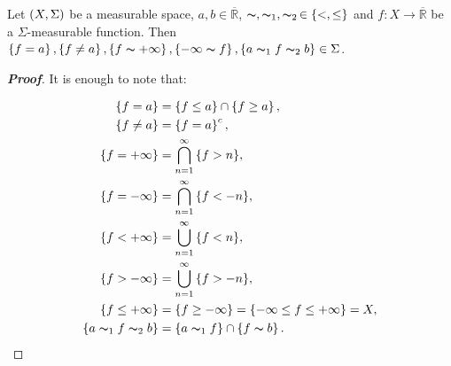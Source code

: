 \begin{corollary}
\rm Let $\left(X,\Sigma\right)$ be a measurable space, $a,b\in\overline{\mathbb{R}}$, $\thicksim,\thicksim_1,\thicksim_2\,\in\left\{<,\leq\right\}$ and $f:X\rightarrow\overline{\mathbb{R}}$ be a $\Sigma$-measurable function. Then $\left\{f=a\right\},\left\{f\neq a\right\},\left\{f\thicksim +\infty\right\},\left\{-\infty\thicksim f\right\},\left\{a\thicksim_1 f\thicksim_2 b\right\}\in\Sigma$.
\begin{proof}[\rm\textbf{Proof}]
It is enough to note that:

\begin{equation}
  \begin{split}
    \left\{f=a\right\} & =\left\{f\leq a\right\}\cap\left\{f\geq a\right\},\\
    \left\{f\neq a\right\} & =\left\{f=a\right\}^c,\\
    \left\{f=+\infty\right\} & =\bigcap_{n=1}^{\infty}{\left\{f>n\right\}},\\
    \left\{f=-\infty\right\} & =\bigcap_{n=1}^{\infty}{\left\{f<-n\right\}},\\
    \left\{f<+\infty\right\} & =\bigcup_{n=1}^{\infty}{\left\{f<n\right\}},\\
    \left\{f>-\infty\right\} & =\bigcup_{n=1}^{\infty}{\left\{f>-n\right\}},\\
    \left\{f\leq +\infty\right\} & =\left\{f\geq -\infty\right\}=\left\{-\infty\leq f\leq +\infty\right\}=X,\\
    \left\{a\thicksim_1 f\thicksim_2 b\right\} & =\left\{a\thicksim_1 f\right\}\cap\left\{f\thicksim b\right\}.
  \end{split}
\end{equation}
\end{proof}
\end{corollary}

